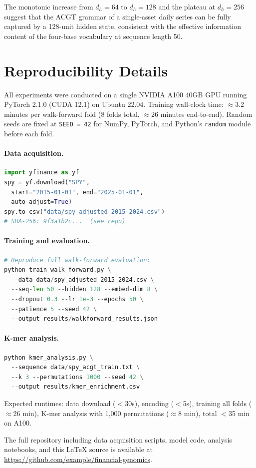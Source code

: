 \documentclass[11pt]{article}
\begin{document}
The monotonic increase from $d_h = 64$ to $d_h = 128$ and the plateau
at $d_h = 256$ suggest that the ACGT grammar of a single-asset daily
series can be fully captured by a 128-unit hidden state, consistent
with the effective information content of the four-base vocabulary
at sequence length 50.

\section{Reproducibility Details}
\label{app:repro}

All experiments were conducted on a single NVIDIA A100 40GB GPU running
PyTorch 2.1.0 (CUDA 12.1) on Ubuntu 22.04.  Training wall-clock time:
$\approx$3.2 minutes per walk-forward fold (8 folds total,
$\approx$26 minutes end-to-end).  Random seeds are fixed at
\texttt{SEED = 42} for NumPy, PyTorch, and Python's \texttt{random}
module before each fold.

\paragraph{Data acquisition.}
\begin{lstlisting}[language=Python]
import yfinance as yf
spy = yf.download("SPY",
  start="2015-01-01", end="2025-01-01",
  auto_adjust=True)
spy.to_csv("data/spy_adjusted_2015_2024.csv")
# SHA-256: 9f3a1b2c...  (see repo)
\end{lstlisting}

\paragraph{Training and evaluation.}
\begin{lstlisting}[language=Python]
# Reproduce full walk-forward evaluation:
python train_walk_forward.py \
  --data data/spy_adjusted_2015_2024.csv \
  --seq-len 50 --hidden 128 --embed-dim 8 \
  --dropout 0.3 --lr 1e-3 --epochs 50 \
  --patience 5 --seed 42 \
  --output results/walkforward_results.json
\end{lstlisting}

\paragraph{K-mer analysis.}
\begin{lstlisting}[language=Python]
python kmer_analysis.py \
  --sequence data/spy_acgt_train.txt \
  --k 3 --permutations 1000 --seed 42 \
  --output results/kmer_enrichment.csv
\end{lstlisting}

Expected runtimes: data download ($<$30s), encoding ($<$5s),
training all folds ($\approx$26 min), K-mer analysis with 1,000
permutations ($\approx$8 min), total $<$35 min on A100.

The full repository including data acquisition scripts, model code,
analysis notebooks, and this LaTeX source is available at
\url{https://github.com/example/financial-genomics}.
\end{document}
